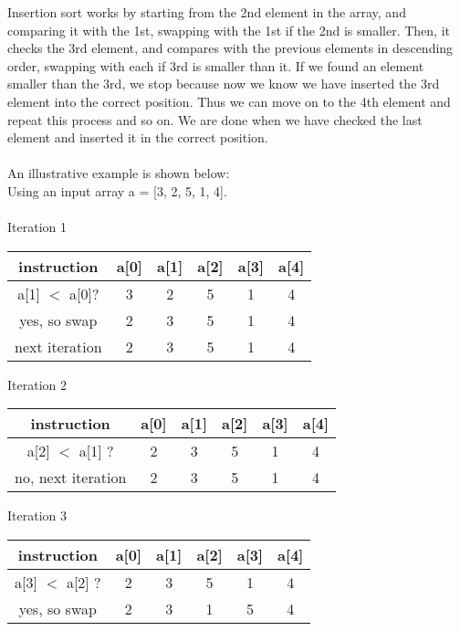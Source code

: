 \documentclass[12pt]{article}
\newenvironment{problem}[2][Problem]{\begin{trivlist}
\item[\hskip \labelsep {\bfseries #1}\hskip \labelsep {\bfseries #2.}]}{\end{trivlist}}
\begin{document}
\begin{problem}{3}
Insertion sort works by starting from the 2nd element in the array, and comparing it with the 1st,
swapping with the 1st if the 2nd is smaller. 
Then, it checks the 3rd element, and compares with the previous elements in descending order,
swapping with each if 3rd is smaller than it. If we found an element smaller than the 3rd,
we stop because now we know we have inserted the 3rd element into the correct position. 
Thus we can move on to the 4th element and repeat this process and so on.
We are done when we have checked the last element and inserted it in the correct position.\\\\
An illustrative example is shown below:\\
Using an input array a = [3, 2, 5, 1, 4].\\\\
Iteration 1
\begin{center}
    \begin{tabular}{|c | c c c c c|} 
        \hline
        instruction & a[0] & a[1] & a[2] & a[3] & a[4]\\
        \hline
        a[1] $<$ a[0]? & 3 & 2 & 5 & 1 & 4 \\ 
        yes, so swap & 2 & 3 & 5 & 1 & 4 \\
        next iteration & 2 & 3 & 5 & 1 & 4 \\
        \hline
    \end{tabular}
\end{center}
Iteration 2
\begin{center}
    \begin{tabular}{|c | c c c c c|} 
        \hline
        instruction & a[0] & a[1] & a[2] & a[3] & a[4]\\
        \hline
        a[2] $<$ a[1] ? & 2 & 3 & 5 & 1 & 4 \\ 
        no, next iteration & 2 & 3 & 5 & 1 & 4 \\
        \hline
    \end{tabular}
\end{center}
\pagebreak
Iteration 3
\begin{center}
    \begin{tabular}{|c | c c c c c|} 
        \hline
        instruction & a[0] & a[1] & a[2] & a[3] & a[4]\\
        \hline
        a[3] $<$ a[2] ? & 2 & 3 & 5 & 1 & 4 \\ 
        yes, so swap & 2 & 3 & 1 & 5 & 4 \\

\end{tabular}
\end{center}
\end{problem}
\end{document}

